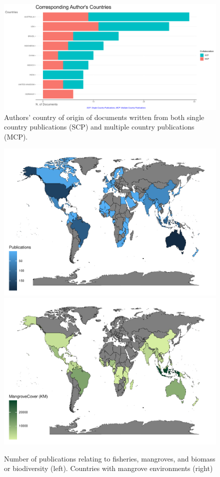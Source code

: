 \documentclass[
  12pt,
]{article}
\begin{document}
\begin{figure}
\includegraphics[width=1\linewidth]{AuthorCountries} \caption{Authors' country of origin of documents written from both single country publications (SCP) and multiple country publications (MCP). \label{AuthorCountries}}\label{fig:AuthorCountries}
\end{figure}



\begin{figure}
\includegraphics[width=0.5\linewidth]{BibinR_files/figure-latex/countryMap-1} \includegraphics[width=0.5\linewidth]{BibinR_files/figure-latex/countryMap-2} \caption{Number of publications relating to fisheries, mangroves, and biomass or biodiversity (left). Countries with mangrove environments (right) \label{countryMap}}\label{fig:countryMap}
\end{figure}
\end{document}
